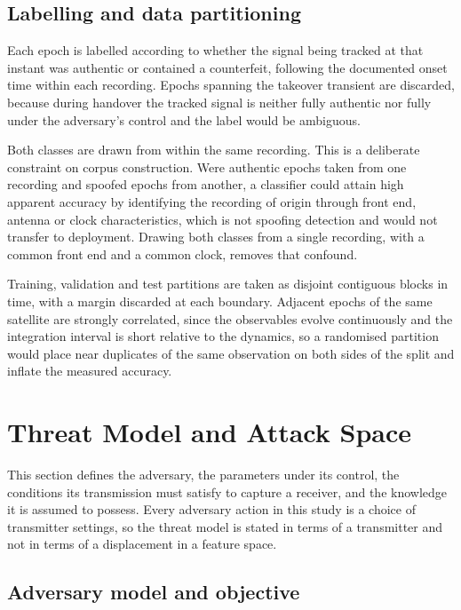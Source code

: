 \documentclass[pdflatex,sn-basic]{sn-jnl}
\theoremstyle{thmstyleone}
\theoremstyle{thmstyletwo}
\theoremstyle{thmstylethree}
\begin{document}
\subsection{Labelling and data partitioning}

Each epoch is labelled according to whether the signal being tracked at that instant was
authentic or contained a counterfeit, following the documented onset time within each
recording. Epochs spanning the takeover transient are discarded, because during handover
the tracked signal is neither fully authentic nor fully under the adversary's control and
the label would be ambiguous.

Both classes are drawn from within the same recording. This is a deliberate constraint on
corpus construction. Were authentic epochs taken from one recording and spoofed epochs
from another, a classifier could attain high apparent accuracy by identifying the
recording of origin through front end, antenna or clock characteristics, which is not
spoofing detection and would not transfer to deployment. Drawing both classes from a
single recording, with a common front end and a common clock, removes that confound.

Training, validation and test partitions are taken as disjoint contiguous blocks in time,
with a margin discarded at each boundary. Adjacent epochs of the same satellite are
strongly correlated, since the observables evolve continuously and the integration
interval is short relative to the dynamics, so a randomised partition would place near
duplicates of the same observation on both sides of the split and inflate the measured
accuracy.

\section{Threat Model and Attack Space}
\label{sec:threat}

This section defines the adversary, the parameters under its control, the conditions its
transmission must satisfy to capture a receiver, and the knowledge it is assumed to
possess. Every adversary action in this study is a choice of transmitter settings, so the
threat model is stated in terms of a transmitter and not in terms of a displacement in
a feature space.

\subsection{Adversary model and objective}
\end{document}

